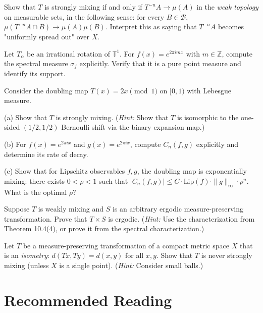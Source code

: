 \begin{exercise}
Show that $T$ is strongly mixing if and only if $T^{-n}A \to \mu(A)$ in the \textit{weak topology} on measurable sets, in the following sense: for every $B \in \mathcal{B}$, $\mu(T^{-n}A \cap B) \to \mu(A)\mu(B)$. Interpret this as saying that $T^{-n}A$ becomes "uniformly spread out" over $X$.
\end{exercise}


\begin{exercise}
Let $T_\alpha$ be an irrational rotation of $\mathbb{T}^1$. For $f(x) = e^{2\pi i m x}$ with $m \in \mathbb{Z}$, compute the spectral measure $\sigma_f$ explicitly. Verify that it is a pure point measure and identify its support.
\end{exercise}


\begin{exercise}
Consider the doubling map $T(x) = 2x \pmod{1}$ on $[0,1)$ with Lebesgue measure.

(a) Show that $T$ is strongly mixing. (\textit{Hint:} Show that $T$ is isomorphic to the one-sided $(1/2, 1/2)$ Bernoulli shift via the binary expansion map.)

(b) For $f(x) = e^{2\pi i x}$ and $g(x) = e^{2\pi i x}$, compute $C_n(f, g)$ explicitly and determine its rate of decay.

(c) Show that for Lipschitz observables $f, g$, the doubling map is exponentially mixing: there exists $0 < \rho < 1$ such that $|C_n(f,g)| \le C \cdot \text{Lip}(f) \cdot \|g\|_\infty \cdot \rho^n$. What is the optimal $\rho$?
\end{exercise}


\begin{exercise}
Suppose $T$ is weakly mixing and $S$ is an arbitrary ergodic measure-preserving transformation. Prove that $T \times S$ is ergodic. (\textit{Hint:} Use the characterization from Theorem 10.4(4), or prove it from the spectral characterization.)
\end{exercise}


\begin{exercise}
Let $T$ be a measure-preserving transformation of a compact metric space $X$ that is an \textit{isometry}: $d(Tx, Ty) = d(x, y)$ for all $x, y$. Show that $T$ is never strongly mixing (unless $X$ is a single point). (\textit{Hint:} Consider small balls.)
\end{exercise}


\section*{Recommended Reading}

